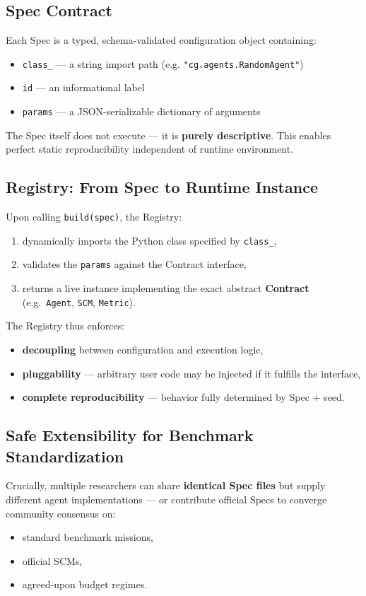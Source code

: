 \subsection{Spec Contract}
Each Spec is a typed, schema-validated configuration object containing:
\begin{itemize}
    \item \texttt{class\_} — a string import path (e.g. \texttt{"cg.agents.RandomAgent"})
    \item \texttt{id} — an informational label
    \item \texttt{params} — a JSON-serializable dictionary of arguments
\end{itemize}

The Spec itself does not execute — it is \textbf{purely descriptive}.  
This enables perfect static reproducibility independent of runtime environment.

\subsection{Registry: From Spec to Runtime Instance}
Upon calling \texttt{build(spec)}, the Registry:
\begin{enumerate}
    \item dynamically imports the Python class specified by \texttt{class\_},
    \item validates the \texttt{params} against the Contract interface,
    \item returns a live instance implementing the exact abstract \textbf{Contract}
          (e.g.\ \texttt{Agent}, \texttt{SCM}, \texttt{Metric}).
\end{enumerate}

The Registry thus enforces:
\begin{itemize}
    \item \textbf{decoupling} between configuration and execution logic,
    \item \textbf{pluggability} — arbitrary user code may be injected if it fulfills the interface,
    \item \textbf{complete reproducibility} — behavior fully determined by Spec + seed.
\end{itemize}

\subsection{Safe Extensibility for Benchmark Standardization}
Crucially, multiple researchers can share \textbf{identical Spec files} but supply different agent implementations —  
or contribute official Specs to converge community consensus on:
\begin{itemize}
    \item standard benchmark missions,
    \item official SCMs,
    \item agreed-upon budget regimes.
\end{itemize}

